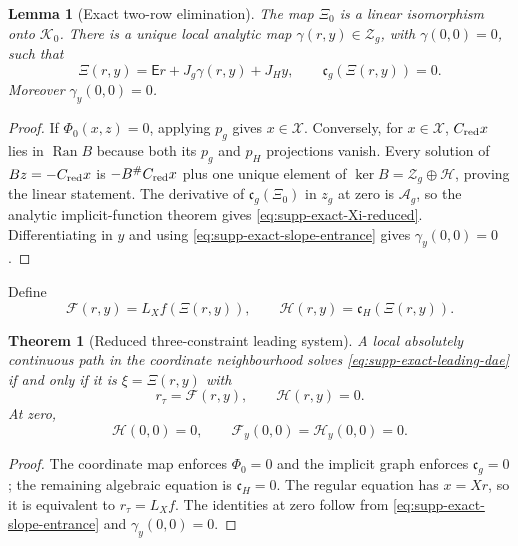 \documentclass[11pt]{article}
\newtheorem{theorem}{Theorem}[section]
\numberwithin{equation}{section}
\newtheorem{lemma}[lemma]{Lemma}
\theoremstyle{definition}
\theoremstyle{remark}
\newcommand{\Ran}{\operatorname{Ran}}
\begin{document}
\begin{lemma}[Exact two-row elimination]
\label{lem:supp-exact-two-row-elimination}
The map $\Xi_0$ is a linear isomorphism onto $\mathcal K_0$.  There is a
unique local analytic map $\gamma(r,y)\in\mathcal Z_g$, with
$\gamma(0,0)=0$, such that
\begin{equation}
 \Xi(r,y)=\mathsf E r+J_g\gamma(r,y)+J_Hy,
 \qquad
 \mathfrak c_g(\Xi(r,y))=0.
 \label{eq:supp-exact-Xi-reduced}
\end{equation}
Moreover $\gamma_y(0,0)=0$.
\end{lemma}
\begin{proof}
If $\Phi_0(x,z)=0$, applying $p_g$ gives $x\in\mathcal X$.  Conversely,
for $x\in\mathcal X$, $C_{\rm red}x$ lies in $\Ran B$ because both its
$p_g$ and $p_H$ projections vanish.  Every solution of
$Bz=-C_{\rm red}x$ is $-B^\#C_{\rm red}x$ plus one unique element of
$\ker B=\mathcal Z_g\oplus\mathcal H$, proving the linear statement.
The derivative of $\mathfrak c_g(\Xi_0)$ in $z_g$ at zero is
$\mathcal A_g$, so the analytic implicit-function theorem gives
\eqref{eq:supp-exact-Xi-reduced}.  Differentiating in $y$ and using
\eqref{eq:supp-exact-slope-entrance} gives $\gamma_y(0,0)=0$.
\end{proof}

Define
\begin{equation}
 \mathcal F(r,y)=L_Xf(\Xi(r,y)),
 \qquad
 \mathcal H(r,y)=\mathfrak c_H(\Xi(r,y)).
 \label{eq:supp-exact-reduced-functions}
\end{equation}

\begin{theorem}[Reduced three-constraint leading system]
\label{thm:supp-exact-reduced-leading-system}
A local absolutely continuous path in the coordinate neighbourhood solves
\eqref{eq:supp-exact-leading-dae} if and only if it is
$\xi=\Xi(r,y)$ with
\begin{equation}
 r_\tau=\mathcal F(r,y),\qquad \mathcal H(r,y)=0.
 \label{eq:supp-exact-reduced-dae}
\end{equation}
At zero,
\begin{equation}
 \mathcal H(0,0)=0,
 \qquad \mathcal F_y(0,0)=\mathcal H_y(0,0)=0.
 \label{eq:supp-exact-paired-zero}
\end{equation}
\end{theorem}
\begin{proof}
The coordinate map enforces $\Phi_0=0$ and the implicit graph enforces
$\mathfrak c_g=0$; the remaining algebraic equation is
$\mathfrak c_H=0$.  The regular equation has $x=Xr$, so it is equivalent
to $r_\tau=L_Xf$.  The identities at zero follow from
\eqref{eq:supp-exact-slope-entrance} and
$\gamma_y(0,0)=0$.
\end{proof}
\end{document}
